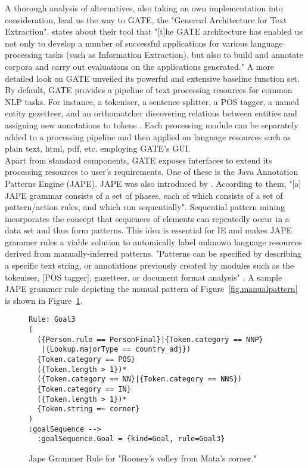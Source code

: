\documentclass[11pt,titlepage,oneside,openany]{book}
\begin{document}
A thorough analysis of alternatives, also taking an own implementation into consideration, lead us the way to GATE, the "Genereal Architecture for Text Extraction". \citeauthor*{Cunningham2002} \citeyearpar[p.1]{Cunningham2002} states about their tool that "[t]he GATE architecture has enabled us not only to develop a number of successful applications for various  language  processing  tasks  (such as  Information  Extraction),  but  also to  build  and  annotate  corpora  and carry out evaluations on the applications generated." A more detailed look on GATE unveiled its powerful and extensive baseline function set. By default, GATE provides a pipeline of text processing resources for common NLP tasks. For instance, a tokeniser, a sentence splitter, a POS tagger, a named entity gezetteer, and an orthomatcher discovering relations between entities and assigning new annotations to tokens \citep[p.5]{Cunningham2002}. Each processing module can be separately added to a processing pipeline and then applied on language resources such as plain text, html, pdf, etc. employing GATE's GUI.\\ 

Apart from standard components, GATE exposes interfaces to extend its processing resources to user's requirements. One of these is the Java Annotation Patterns Engine (JAPE). JAPE was also introduced by \citeauthor*{Cunningham1999} \citeyearpar{Cunningham1999}. According to them, "[a] JAPE grammar consists of a set of phases, each of which consists of a set of pattern/action rules, and which run sequentially". Sequential pattern mining \citep{Agrawal1995} incorporates the concept that sequences of elements can repeatedly occur in a data set and thus form patterns. This idea is essential for IE and makes JAPE grammer rules a viable solution to automically label unknown language resources derived from manually-inferred patterns. "Patterns can be speciﬁed by describing a speciﬁc text string, or annotations previously created by modules such as the tokeniser, [POS tagger], gazetteer, or document format analysis"  \citep[p.5]{Cunningham2002}. A sample JAPE grammer rule depicting the manual pattern of Figure~\ref{fig.manualpattern} is shown in Figure~\ref{fig.jape}.\\
\begin{figure} [h!]
\centering
\begin{lstlisting}[frame=single]
Rule: Goal3
(
  ({Person.rule == PersonFinal}|{Token.category == NNP}
   |{Lookup.majorType == country_adj})
  {Token.category == POS}
  ({Token.length > 1})*
  ({Token.category == NN}|{Token.category == NNS})
  {Token.category == IN} 
  ({Token.length > 1})*
  {Token.string =~ corner}
)
:goalSequence -->
  :goalSequence.Goal = {kind=Goal, rule=Goal3}
\end{lstlisting}
\caption{Jape Grammer Rule for "Rooney's volley from Mata's corner."}
\label{fig.jape}
\end{figure}
\end{document}
